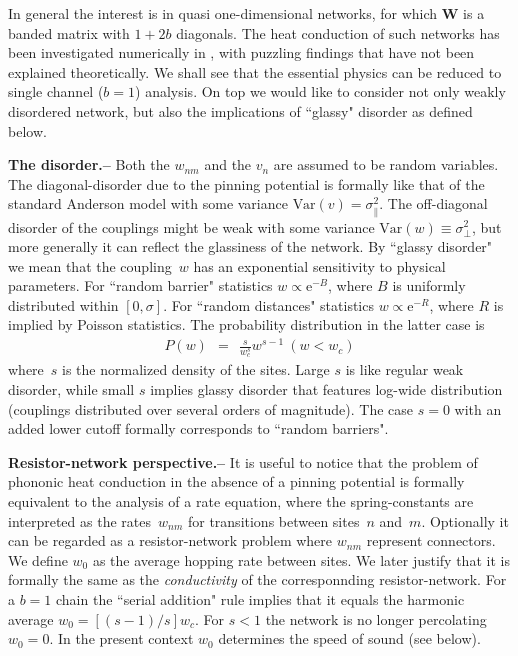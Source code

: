 \documentclass[twocolumn,showpacs,aps,pre]{revtex4-1}
\newcommand{\eexp}[1]{\mathrm{e}^{#1}}
\newcommand{\beq}{\begin{eqnarray}}
\newcommand{\eeq}{\end{eqnarray}}
\newcommand{\sect}[1]{{\bf #1.-- }}
\begin{document}
In general the interest is in quasi one-dimensional networks, 
for which $\bm{W}$ is a banded matrix with ${1{+}2b}$ diagonals. 
The heat conduction of such networks has been investigated numerically 
in \cite{BZFK13}, with puzzling findings that have not been explained 
theoretically. We shall see that the essential physics can be 
reduced to single channel ($b=1$) analysis. On top we would like  
to consider not only weakly disordered network, but also 
the implications of ``glassy" disorder as defined below.   


\sect{The disorder}
%
Both the $w_{nm}$ and the $v_n$ are assumed to 
be random variables. The diagonal-disorder due to the pinning
potential is formally like that of the standard Anderson model 
with some variance ${\mbox{Var}(v)=\sigma_{\parallel}^2}$.    
The off-diagonal disorder of the couplings might be 
weak with some variance ${\mbox{Var}(w) \equiv \sigma_{\perp}^2}$, 
but more generally it can reflect the glassiness of the network. 
%
By ``glassy disorder" we mean that the coupling~$w$ has an 
exponential sensitivity to physical parameters.  
For ``random barrier" statistics ${ w \propto \eexp{-B} }$, 
where $B$ is uniformly distributed within $[0,\sigma]$. 
For ``random distances" statistics ${ w \propto \eexp{-R} }$,
where $R$ is implied by Poisson statistics. 
The probability distribution in the latter case is 
%
\beq
P(w) \ \ = \ \ \frac{s}{w_c^{s}} w^{s-1} \ (w<w_c)
\eeq
%
where~$s$ is the normalized density of the sites.
Large $s$ is like regular weak disorder, while small $s$ 
implies glassy disorder that features log-wide distribution  
(couplings distributed over several orders of magnitude). 
The case $s=0$ with an added lower cutoff 
formally corresponds to ``random barriers". 


\sect{Resistor-network perspective}
%
It is useful to notice that the problem of phononic heat conduction 
in the absence of a pinning potential is formally equivalent 
to the analysis of a rate equation, where the spring-constants 
are interpreted as the rates~$w_{nm}$ 
for transitions between sites~$n$ and~$m$. 
Optionally it can be regarded as a resistor-network problem 
where $w_{nm}$ represent connectors. 
%
We define $w_0$ as the average hopping rate between sites. 
We later justify that it is formally the same 
as the {\em conductivity} of the corresponnding resistor-network.   
For a ${b=1}$ chain the ``serial addition" rule 
implies that it equals the harmonic average ${w_0=[(s{-}1)/s]w_c}$. 
For ${s<1}$ the network is no longer percolating ${w_0=0}$.  
In the present context $w_0$ determines the speed of sound (see below).
\end{document}
